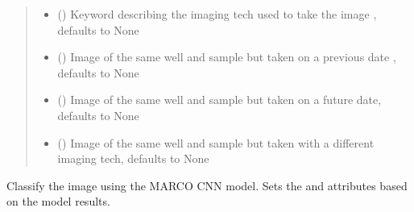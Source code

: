 \documentclass[letterpaper,10pt,english]{sphinxmanual}
\begin{document}
\begin{fulllineitems}
\begin{quote}
\begin{description}
\begin{itemize}
\item {} 
 (\sphinxstyleliteralemphasis{\sphinxupquote{, }}) \textendash{} Keyword describing the imaging tech used to take the image
, defaults to None

\item {} 
 ({\hyperref[\detokenize{polo.crystallography:polo.crystallography.image.Image}]{}}\sphinxstyleliteralemphasis{\sphinxupquote{, }}) \textendash{} Image of the same well and sample but taken on a previous date
, defaults to None

\item {} 
 ({\hyperref[\detokenize{polo.crystallography:polo.crystallography.image.Image}]{}}\sphinxstyleliteralemphasis{\sphinxupquote{, }}) \textendash{} Image of the same well and sample but taken on a future 
date, defaults to None

\item {} 
 ({\hyperref[\detokenize{polo.crystallography:polo.crystallography.image.Image}]{}}\sphinxstyleliteralemphasis{\sphinxupquote{, }}) \textendash{} Image of the same well and sample but taken with a 
different imaging tech, defaults to None

\end{itemize}

\end{description}\end{quote}

\begin{fulllineitems}
\label{\detokenize{polo.crystallography:polo.crystallography.image.Image.classify_image}}
Classify the image using the MARCO CNN model. Sets the 
 and  attributes based on the
model results.


\end{fulllineitems}
\end{fulllineitems}
\end{document}
